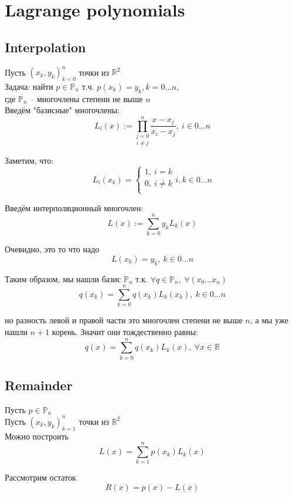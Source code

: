 \documentclass[12pt,a4paper]{article}
\begin{document}
	
	\tableofcontents
	
	\newpage
	\section{Lagrange polynomials}
	
	\subsection{Interpolation}
	Пусть $(x_k, y_k)_{k=0}^{n}$ точки из $\mathbb{R}^2$ \\
	Задача: найти $p \in \mathbb{P}_n$ т.ч. $p(x_k)=y_k, k=0 \ldots n$,\\
	где $\mathbb{P}_n$ -- многочлены степени не выше $n$\\
	
	\noindent Введём "базисные" многочлены:\\
	\[
	L_i(x) := \underset{i \neq j}{\prod_{j=0}^{n}} \frac{x - x_j}{x_i - x_j}, \ i \in 0 \ldots n
	\]
	
	\noindent Заметим, что:
	\[
	L_i(x_k) = 
	\begin{cases}
	1, \ i=k \\ 
	0, \ i \neq k\\
	\end{cases}i,k \in 0 \ldots n
	\]
	
	\noindent Введём интерполяционный многочлен:
	\[
	L(x) := \sum_{k=0}^{n} y_k L_k(x)
	\]
	
	
	\noindent Очевидно, это то что надо
	\[
	L(x_k) = y_k, \ k \in 0 \ldots n
	\]
	
	\noindent Таким образом, мы нашли базис $\mathbb{P}_n$ т.к. $\forall q \in \mathbb{P}_n, \ \forall(x_0 \ldots x_n)$
	\[
	q(x_k) = \sum_{k=0}^{n} q(x_k) L_k(x_k), \ k \in 0 \ldots n
	\]
	
	\noindent но разность левой и правой части это многочлен степени не выше $n$, а мы уже нашли $n+1$ корень. Значит они тождественно равны:
	\[
	q(x) = \sum_{k=0}^{n} q(x_k) L_k(x), \ \forall x \in \mathbb{R}
	\]
	
	\newpage
	\subsection{Remainder}
	Пусть $p \in \mathbb{P}_n$\\
	Пусть $(x_k, y_k)_{k=1}^{n}$ точки из $\mathbb{R}^2$ \\
	Можно построить
	\[
	L(x) = \sum_{k=1}^{n} p(x_k) L_k(x)
	\]
	
	\noindent Рассмотрим остаток
	\[
	R(x) = p(x) - L(x)
	\]
	
\end{document}
